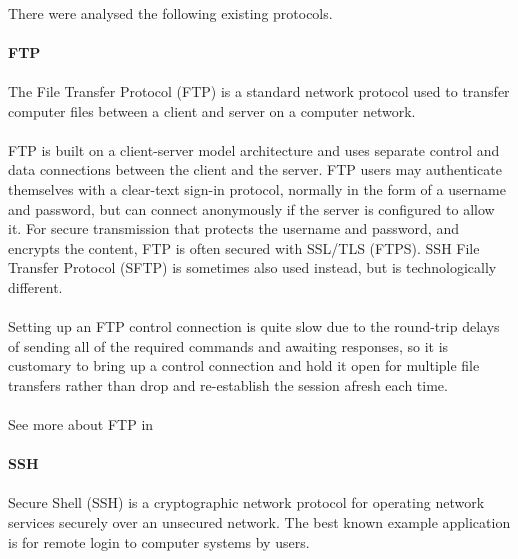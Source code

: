 \paragraph{}
There were analysed the following existing protocols.

\paragraph{} \textbf{FTP}
\paragraph{}
The File Transfer Protocol (FTP) is a standard network protocol used to transfer computer files between a client and server on a computer network.
\paragraph{}
FTP is built on a client-server model architecture and uses separate control and data connections between the client and the server. FTP users may authenticate themselves with a clear-text sign-in protocol, normally in the form of a username and password, but can connect anonymously if the server is configured to allow it. For secure transmission that protects the username and password, and encrypts the content, FTP is often secured with SSL/TLS (FTPS). SSH File Transfer Protocol (SFTP) is sometimes also used instead, but is technologically different.
\paragraph{}
Setting up an FTP control connection is quite slow due to the round-trip delays of sending all of the required commands and awaiting responses, so it is customary to bring up a control connection and hold it open for multiple file transfers rather than drop and re-establish the session afresh each time. 
\paragraph{}
See more about FTP in \cite{FTP}


\paragraph{} \textbf{SSH}
\paragraph{} 
Secure Shell (SSH) is a cryptographic network protocol for operating network services securely over an unsecured network. The best known example application is for remote login to computer systems by users.
